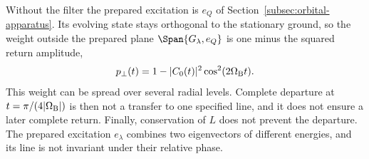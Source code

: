 Without the filter the prepared excitation is $e_Q$ of Section~\ref{subsec:orbital-apparatus}. Its evolving state stays orthogonal to the stationary ground, so the weight outside the prepared plane $\Span\{G_\lambda,e_Q\}$ is one minus the squared return amplitude,
\begin{equation}
 p_\perp(t)=1-|C_0(t)|^2\cos^2(2\Omega_{\rm B}t).
 \label{eq:pair-currents-unfiltered}
\end{equation}
This weight can be spread over several radial levels. Complete departure at $t=\pi/(4|\Omega_{\rm B}|)$ is then not a transfer to one specified line, and it does not ensure a later complete return. Finally, conservation of $L$ does not prevent the departure. The prepared excitation $e_\lambda$ combines two eigenvectors of different energies, and its line is not invariant under their relative phase.
